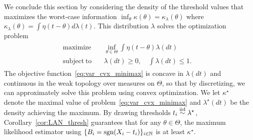 We conclude this section by considering the density of the threshold values
that maximizes the worst-case information $\inf_\theta \kappa(\theta)
= \kappa_\lambda(\theta)$ where $\kappa_\lambda(\theta)
= \int \eta(t - \theta) d\lambda(t)$.
This distribution $\lambda$ solves the
optimization problem
\begin{align}
  \label{eq:var_cvx_minimax}
  \begin{split}
    \mathrm{maximize} \quad &  \inf_{\theta \in \Theta} \int \eta(t-\theta) \lambda(dt)
    \\ 
    \mathrm{subject~to} 
    \quad & \lambda(dt)\geq 0,\quad \int \lambda(dt) \leq 1. 
  \end{split}
\end{align}
The objective function~\eqref{eq:var_cvx_minimax} is concave in
$\lambda(dt)$ and continuous in the weak topology over measures on $\Theta$,
so that by discretizing, we can approximately solve this problem using
convex optimization. We let $\kappa^\star$ denote the maximal value of
problem~\eqref{eq:var_cvx_minimax} and $\lambda^\star(dt)$ be the density
achieving the maximum. By drawing thresholds
$t_i \stackrel{\textup{iid}}{\sim} \lambda^\star$,
Corollary~\ref{cor:LAN_thresh} guarantees that for any $\theta \in \Theta$, the
maximum likelihood estimator
using $\{B_i = \mathrm{sgn}(X_i - t_i)\}_{i \in \mathbb{N}}$ is at least $\kappa^\star$.
%

